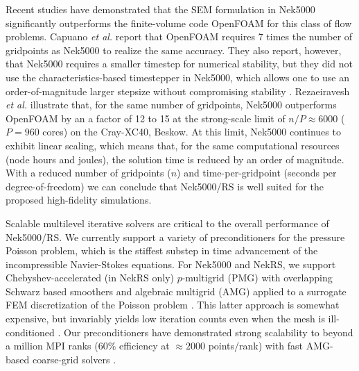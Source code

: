 Recent studies
have demonstrated that the SEM formulation in Nek5000 significantly outperforms
the finite-volume code OpenFOAM for this class of flow problems.  Capuano {\em
et al.} \cite{capuano19} report that OpenFOAM requires 7 times the number of
gridpoints as Nek5000 to realize the same accuracy.  They also report, however,
that Nek5000 requires a smaller timestep for numerical stability, but they did
not use the characteristics-based timestepper in Nek5000, which allows one to
use an order-of-magnitude larger stepsize without compromising stability
\cite{patel18}.  Rezaeiravesh {\em et al.} \cite{schlatter21} illustrate that,
for the same number of gridpoints, Nek5000 outperforms OpenFOAM by an a factor
of 12 to 15 at the strong-scale limit of $n/P \approx 6000$ ($P=960$ cores) on
the Cray-XC40, Beskow.  At this limit, Nek5000 continues to exhibit linear
scaling, which means that, for the same computational resources (node hours and
joules), the solution time is reduced by an order of magnitude.  With a reduced
number of gridpoints ($n$) and time-per-gridpoint (seconds per
degree-of-freedom) we can conclude that Nek5000/RS is well suited for the 
proposed high-fidelity simulations.

Scalable multilevel iterative solvers are critical to the overall performance
of Nek5000/RS.   We currently support a variety of preconditioners for the
pressure Poisson problem, which is the stiffest substep in time advancement of
the incompressible Navier-Stokes equations.  For Nek5000 and NekRS, we support
Chebyshev-accelerated (in NekRS only) $p$-multigrid (PMG) with overlapping
Schwarz based smoothers \cite{lottes05,nekrs} and algebraic multigrid (AMG)
applied to a surrogate FEM discretization of the Poisson problem
\cite{pedro19,sao80}.  This latter approach is somewhat expensive, but
invariably yields low iteration counts even when the mesh is ill-conditioned
\cite{fischer97}.  Our preconditioners have demonstrated strong scalability to
beyond a million MPI ranks (60\% efficiency at $\approx 2000$ points/rank) with
fast AMG-based coarse-grid solvers \cite{fischer15}.


